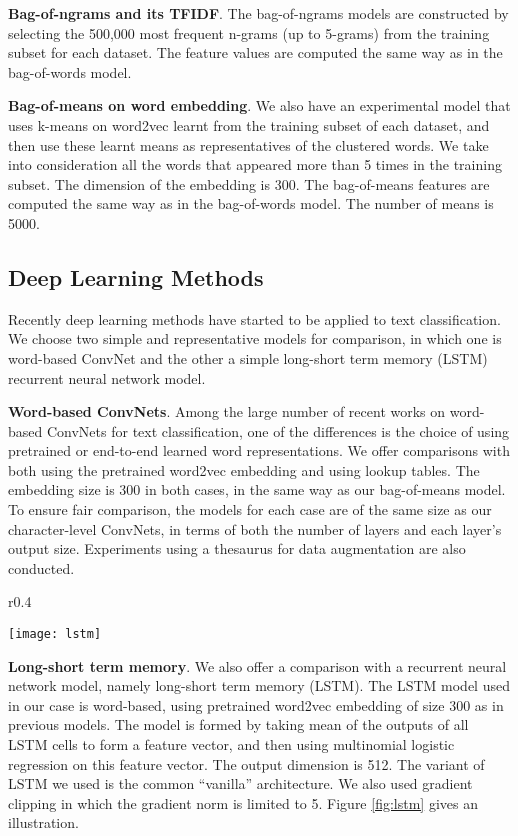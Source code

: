 \documentclass{article} \usepackage{nips15submit_e,times}
\begin{document}
\textbf{Bag-of-ngrams and its TFIDF}. The bag-of-ngrams models are constructed by selecting the 500,000 most frequent n-grams (up to 5-grams) from the training subset for each dataset. The feature values are computed the same way as in the bag-of-words model.

\textbf{Bag-of-means on word embedding}. We also have an experimental model that uses k-means on word2vec\cite{MSCCD13} learnt from the training subset of each dataset, and then use these learnt means as representatives of the clustered words. We take into consideration all the words that appeared more than 5 times in the training subset. The dimension of the embedding is 300. The bag-of-means features are computed the same way as in the bag-of-words model. The number of means is 5000.

\subsection{Deep Learning Methods}

Recently deep learning methods have started to be applied to text classification. We choose two simple and representative models for comparison, in which one is word-based ConvNet and the other a simple long-short term memory (LSTM)\cite{HS97} recurrent neural network model.

\textbf{Word-based ConvNets}. Among the large number of recent works on word-based ConvNets for text classification, one of the differences is the choice of using pretrained or end-to-end learned word representations. We offer comparisons with both using the pretrained word2vec\cite{MSCCD13} embedding\cite{K14} and using lookup tables\cite{CWB11}. The embedding size is 300 in both cases, in the same way as our bag-of-means model. To ensure fair comparison, the models for each case are of the same size as our character-level ConvNets, in terms of both the number of layers and each layer's output size. Experiments using a thesaurus for data augmentation are also conducted.

\begin{wrapfigure}{r}{0.4\textwidth}
  \begin{center}
    \texttt{[image: lstm]}
  \end{center}
  \caption{long-short term memory}
  \label{fig:lstm}
\end{wrapfigure}

\textbf{Long-short term memory}. We also offer a comparison with a recurrent neural network model, namely long-short term memory (LSTM)\cite{HS97}. The LSTM model used in our case is word-based, using pretrained word2vec embedding of size 300 as in previous models. The model is formed by taking mean of the outputs of all LSTM cells to form a feature vector, and then using multinomial logistic regression on this feature vector. The output dimension is 512. The variant of LSTM we used is the common ``vanilla'' architecture\cite{GS05}\cite{GSKSS15}. We also used gradient clipping\cite{PMB13} in which the gradient norm is limited to 5. Figure \ref{fig:lstm} gives an illustration.
\end{document}
